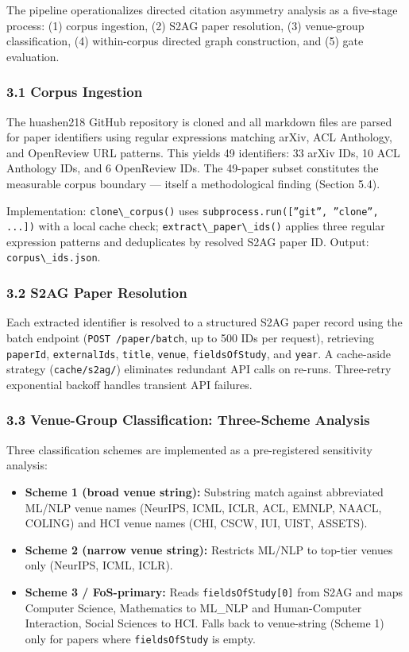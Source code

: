 
The pipeline operationalizes directed citation asymmetry analysis as a five-stage process: (1) corpus ingestion, (2) S2AG paper resolution, (3) venue-group classification, (4) within-corpus directed graph construction, and (5) gate evaluation.

\subsubsection{3.1 Corpus Ingestion}

The huashen218 GitHub repository is cloned and all markdown files are parsed for paper identifiers using regular expressions matching arXiv, ACL Anthology, and OpenReview URL patterns. This yields 49 identifiers: 33 arXiv IDs, 10 ACL Anthology IDs, and 6 OpenReview IDs. The 49-paper subset constitutes the measurable corpus boundary --- itself a methodological finding (Section 5.4).

Implementation: \texttt{clone\textbackslash \_corpus()} uses \texttt{subprocess.run([''git'', ''clone'', ...])} with a local cache check; \texttt{extract\textbackslash \_paper\textbackslash \_ids()} applies three regular expression patterns and deduplicates by resolved S2AG paper ID. Output: \texttt{corpus\textbackslash \_ids.json}.

\subsubsection{3.2 S2AG Paper Resolution}

Each extracted identifier is resolved to a structured S2AG paper record using the batch endpoint (\texttt{POST /paper/batch}, up to 500 IDs per request), retrieving \texttt{paperId}, \texttt{externalIds}, \texttt{title}, \texttt{venue}, \texttt{fieldsOfStudy}, and \texttt{year}. A cache-aside strategy (\texttt{cache/s2ag/}) eliminates redundant API calls on re-runs. Three-retry exponential backoff handles transient API failures.

\subsubsection{3.3 Venue-Group Classification: Three-Scheme Analysis}

Three classification schemes are implemented as a pre-registered sensitivity analysis:

\begin{itemize}
\item \textbf{Scheme 1 (broad venue string):} Substring match against abbreviated ML/NLP venue names (NeurIPS, ICML, ICLR, ACL, EMNLP, NAACL, COLING) and HCI venue names (CHI, CSCW, IUI, UIST, ASSETS).
\item \textbf{Scheme 2 (narrow venue string):} Restricts ML/NLP to top-tier venues only (NeurIPS, ICML, ICLR).
\item \textbf{Scheme 3 / FoS-primary:} Reads \texttt{fieldsOfStudy[0]} from S2AG and maps {Computer Science, Mathematics} to ML\_NLP and {Human-Computer Interaction, Social Sciences} to HCI. Falls back to venue-string (Scheme 1) only for papers where \texttt{fieldsOfStudy} is empty.
\end{itemize}

